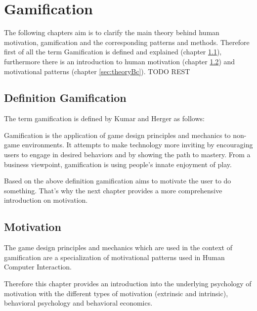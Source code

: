 \newpage
\section{Gamification}
\label{sec:theoryB}

The following chapters aim is to clarify the main theory behind human motivation, gamification and the corresponding patterns and methods. Therefore first of all the term Gamification is defined and explained (chapter \ref{sec:theoryBa}), furthermore there is an introduction to human motivation (chapter \ref{sec:theoryBb}) and motivational patterns (chapter \ref{sec:theoryBc}). TODO REST

\subsection{Definition Gamification}
\label{sec:theoryBa}

The term gamification is defined by Kumar and Herger as follows:

\begin{fquote}
	Gamification is the application of game design principles and mechanics to
	non-game environments. It attempts to make technology more inviting by encouraging users to engage in desired behaviors and by showing the path to mastery.
	From a business viewpoint, gamification is using people’s innate enjoyment of play.
\end{fquote}

Based on the above definition gamification aims to motivate the user to do something. That's why the next chapter provides a more comprehensive introduction on motivation. \cite[p. 8]{inproceedings}

\subsection{Motivation}
\label{sec:theoryBb}

The game design principles and mechanics which are used in the context of gamification are a specialization of motivational patterns used in Human Computer Interaction. \cite[p. 59]{inproceedings}

Therefore this chapter provides an introduction into the underlying psychology of motivation with the different types of motivation (extrinsic and intrinsic), behavioral psychology and behavioral economics.

